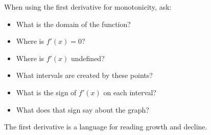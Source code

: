 \begin{summarybox}
When using the first derivative for monotonicity, ask:
\begin{itemize}
\item What is the domain of the function?
\item Where is \(f'(x)=0\)?
\item Where is \(f'(x)\) undefined?
\item What intervals are created by these points?
\item What is the sign of \(f'(x)\) on each interval?
\item What does that sign say about the graph?
\end{itemize}
\end{summarybox}

The first derivative is a language for reading growth and decline.